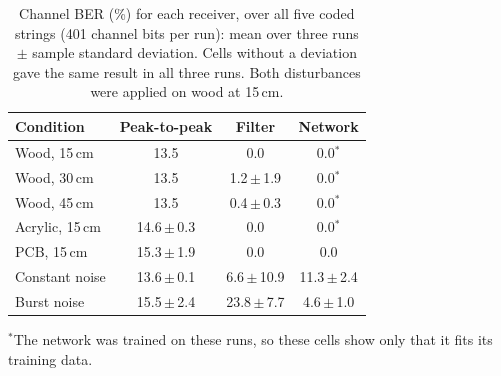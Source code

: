\begin{table}[!t]
\centering
\caption{Channel BER (\%) for each receiver, over all five coded strings (401 channel bits per run): mean over three runs $\pm$ sample standard deviation. Cells without a deviation gave the same result in all three runs. Both disturbances were applied on wood at 15\,cm.}
\label{tab:ber_extensions}
\footnotesize
\setlength{\tabcolsep}{4pt}
\begin{tabular*}{\columnwidth}{@{\extracolsep{\fill}}lccc@{}}
\toprule
\textbf{Condition} & \textbf{Peak-to-peak} & \textbf{Filter} & \textbf{Network} \\
\midrule
Wood, 15\,cm & 13.5 & 0.0 & 0.0$^{*}$ \\
Wood, 30\,cm & 13.5 & 1.2{\scriptsize\,$\pm$\,1.9} & 0.0$^{*}$ \\
Wood, 45\,cm & 13.5 & 0.4{\scriptsize\,$\pm$\,0.3} & 0.0$^{*}$ \\
Acrylic, 15\,cm & 14.6{\scriptsize\,$\pm$\,0.3} & 0.0 & 0.0$^{*}$ \\
PCB, 15\,cm & 15.3{\scriptsize\,$\pm$\,1.9} & 0.0 & 0.0 \\
\midrule
Constant noise & 13.6{\scriptsize\,$\pm$\,0.1} & 6.6{\scriptsize\,$\pm$\,10.9} & 11.3{\scriptsize\,$\pm$\,2.4} \\
Burst noise & 15.5{\scriptsize\,$\pm$\,2.4} & 23.8{\scriptsize\,$\pm$\,7.7} & 4.6{\scriptsize\,$\pm$\,1.0} \\
\bottomrule
\end{tabular*}
\par\vspace{2pt}
\begin{minipage}{\columnwidth}\scriptsize
$^{*}$The network was trained on these runs, so these cells show only that it fits its training data.
\end{minipage}
\end{table}
